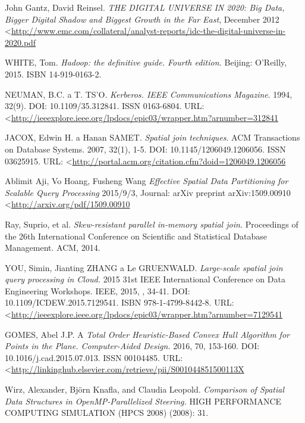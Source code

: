 \documentclass[a4paper,12pt,oneside]{report}
\begin{document}
	\begin{thebibliography}{99}
		\label{References}
		
		John Gantz, David Reinsel. \textit{THE DIGITAL UNIVERSE IN 2020: Big Data, Bigger Digital Shadow and Biggest Growth in
		the Far East}, December 2012
		\textless\url{http://www.emc.com/collateral/analyst-reports/idc-the-digital-universe-in-2020.pdf}
		
		WHITE, Tom. \textit{Hadoop: the definitive guide. Fourth edition.} Beijing:
		O'Reilly, 2015. ISBN 14-919-0163-2.
		
		NEUMAN, B.C. a T. TS'O. \textit{Kerberos. IEEE Communications Magazine}. 1994,
		32(9). DOI: 10.1109/35.312841. ISSN 0163-6804.  URL:
		\textless\url{http://ieeexplore.ieee.org/lpdocs/epic03/wrapper.htm?arnumber=312841}

		JACOX, Edwin H. a Hanan SAMET. \textit{Spatial join techniques}. ACM
		Transactions on Database Systems. 2007, 32(1), 1-5. DOI:
		10.1145/1206049.1206056. ISSN 03625915. URL:
		\textless\url{http://portal.acm.org/citation.cfm?doid=1206049.1206056}
		
		Ablimit Aji, Vo Hoang, Fusheng Wang \textit{Effective Spatial Data Partitioning
			for Scalable Query Processing} 2015/9/3,
		Journal: arXiv preprint arXiv:1509.00910
		\textless\url{http://arxiv.org/pdf/1509.00910}
		
		Ray, Suprio, et al. \textit{Skew-resistant parallel in-memory spatial join.}
		Proceedings of the 26th International Conference on Scientific and Statistical
		Database Management. ACM, 2014.
		
		YOU, Simin, Jianting ZHANG a Le GRUENWALD. \textit{Large-scale spatial join
			query processing in Cloud.} 2015 31st IEEE International Conference on Data
		Engineering Workshops. IEEE, 2015, , 34-41. DOI: 10.1109/ICDEW.2015.7129541.
		ISBN 978-1-4799-8442-8. URL:
		\textless\url{http://ieeexplore.ieee.org/lpdocs/epic03/wrapper.htm?arnumber=7129541}
		
		GOMES, Abel J.P. A \textit{Total Order Heuristic-Based Convex Hull Algorithm for
			Points in the Plane. Computer-Aided Design.} 2016, 70, 153-160. DOI:
		10.1016/j.cad.2015.07.013. ISSN 00104485.  URL:
		\textless\url{http://linkinghub.elsevier.com/retrieve/pii/S001044851500113X}
		
		Wirz, Alexander, Björn Knafla, and Claudia Leopold. \textit{Comparison of
			Spatial Data Structures in OpenMP-Parallelized Steering.} HIGH PERFORMANCE
		COMPUTING  SIMULATION (HPCS 2008) (2008): 31.
		

\end{thebibliography}
\end{document}
